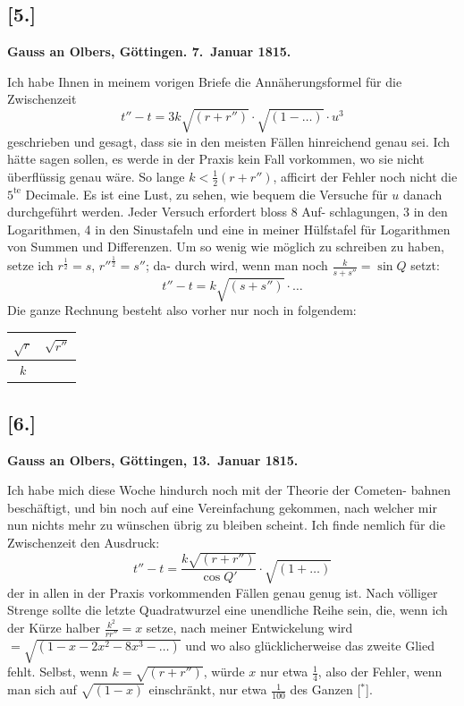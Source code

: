 \documentclass[12pt,a4paper]{article}
\begin{document}
\newpage

\subsection*{[5.]}
\textbf{Gauss an Olbers, G\"ottingen. 7.~Januar 1815.}

Ich habe Ihnen in meinem vorigen Briefe die Ann\"aherungsformel f\"ur die
Zwischenzeit
\[
t'' - t = 3k\sqrt{(r + r'')} \cdot \sqrt{(1 - \ldots)} \cdot u^3
\]
geschrieben und gesagt, dass sie in den meisten F\"allen hinreichend genau sei.
Ich h\"atte sagen sollen, es werde in der Praxis kein Fall vorkommen, wo sie
nicht \"uberfl\"ussig genau w\"are. So lange $k < \tfrac{1}{2}(r + r'')$, afficirt der Fehler noch
nicht die $5^\text{te}$ Decimale. Es ist eine Lust, zu sehen, wie bequem die Versuche
f\"ur $u$ danach durchgef\"uhrt werden. Jeder Versuch erfordert bloss 8 Auf-
schlagungen, 3 in den Logarithmen, 4 in den Sinustafeln und eine in meiner
H\"ulfstafel f\"ur Logarithmen von Summen und Differenzen. Um so wenig wie
m\"oglich zu schreiben zu haben, setze ich $r^{\frac{1}{2}} = s$, $r''^{\frac{1}{2}} = s''$; da-
durch wird, wenn man noch $\frac{k}{s + s''} = \sin Q$ setzt:
\[
t'' - t = k\sqrt{(s + s'')} \cdot \ldots
\]
Die ganze Rechnung besteht also vorher nur noch in folgendem:
\begin{center}
\begin{tabular}{c|c}
$\sqrt{r}$ & $\sqrt{r''}$ \\
\hline
$k$ & 
\end{tabular}
\end{center}

\begin{flushright}
\end{flushright}

\newpage

\subsection*{[6.]}
\textbf{Gauss an Olbers, G\"ottingen, 13.~Januar 1815.}

Ich habe mich diese Woche hindurch noch mit der Theorie der Cometen-
bahnen besch\"aftigt, und bin noch auf eine Vereinfachung gekommen, nach
welcher mir nun nichts mehr zu w\"unschen \"ubrig zu bleiben scheint. Ich
finde nemlich f\"ur die Zwischenzeit den Ausdruck:
\[
t'' - t = \frac{k\sqrt{(r + r'')}}{\cos Q'} \cdot \sqrt{(1 + \ldots)}
\]
der in allen in der Praxis vorkommenden F\"allen genau genug ist. Nach
v\"olliger Strenge sollte die letzte Quadratwurzel eine unendliche Reihe sein,
die, wenn ich der K\"urze halber $\frac{k^2}{rr''} = x$ setze, nach meiner Entwickelung
wird $= \sqrt{(1 - x - 2x^2 - 8x^3 - \ldots)}$ und wo also gl\"ucklicherweise das zweite
Glied fehlt. Selbst, wenn $k = \sqrt{(r + r'')}$, w\"urde $x$ nur etwa $\tfrac{1}{4}$, also der Fehler,
wenn man sich auf $\sqrt{(1 - x)}$ einschr\"ankt, nur etwa $\tfrac{1}{100}$ des Ganzen [$^*$].
\end{document}
